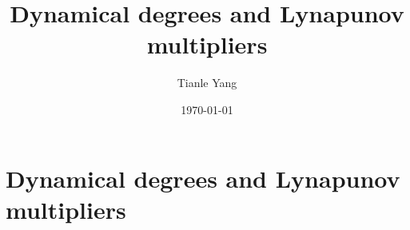 \documentclass[sectionlevel=section,status=draft]{noteformyself}
\title{Dynamical degrees and Lynapunov multipliers}
\author{Tianle Yang}
\date{\today}
\begin{document}
    \maketitle

    \section[
      status=draft,
      tag=00000,
      label=\labelNFM{sec:actions-on-cohomology:dynamical-degrees-and-lynapunov-multipliers}
    ]{Dynamical degrees and Lynapunov multipliers}

    

\end{document}
